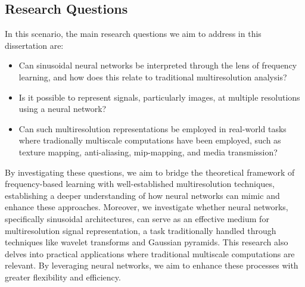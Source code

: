 




\subsection{Research Questions}

In this scenario, the main research questions we aim to address in this dissertation are:

\begin{itemize}
    \item Can sinusoidal neural networks be interpreted through the lens of frequency learning, and how does this relate to traditional multiresolution analysis? 
    \item Is it possible to represent signals, particularly images, at multiple resolutions using a neural network?
    \item Can such multiresolution representations be employed in real-world tasks where tradionally multiscale computations have been employed, such as texture mapping, anti-aliasing, mip-mapping, and media transmission?
\end{itemize}  
  
By investigating these questions, we aim to bridge the theoretical framework of frequency-based learning with well-established multiresolution techniques, establishing a deeper understanding of how neural networks can mimic and enhance these approaches. Moreover, we investigate whether neural networks, specifically sinusoidal architectures, can serve as an effective medium for multiresolution signal representation, a task traditionally handled through techniques like wavelet transforms and Gaussian pyramids. This research also delves into practical applications where traditional multiscale computations are relevant. By leveraging neural networks, we aim to enhance these processes with greater flexibility and efficiency.


